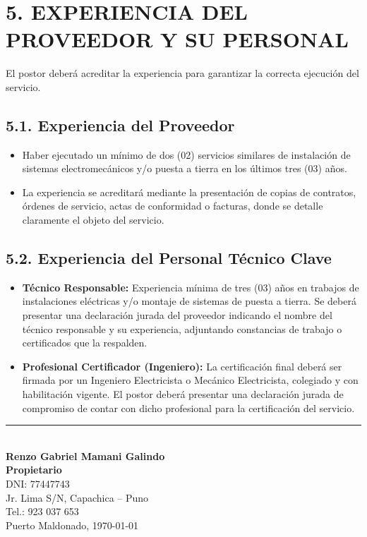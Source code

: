 \documentclass[12pt,a4paper]{article}
\begin{document}
\section*{5. EXPERIENCIA DEL PROVEEDOR Y SU PERSONAL}

El postor deberá acreditar la experiencia para garantizar la correcta ejecución del servicio.

\subsection*{5.1. Experiencia del Proveedor}

\begin{itemize}
  \item Haber ejecutado un mínimo de dos (02) servicios similares de instalación de sistemas electromecánicos y/o puesta a tierra en los últimos tres (03) años.
  \item La experiencia se acreditará mediante la presentación de copias de contratos, órdenes de servicio, actas de conformidad o facturas, donde se detalle claramente el objeto del servicio.
\end{itemize}

\subsection*{5.2. Experiencia del Personal Técnico Clave}

\begin{itemize}
  \item \textbf{Técnico Responsable:} Experiencia mínima de tres (03) años en trabajos de instalaciones eléctricas y/o montaje de sistemas de puesta a tierra. Se deberá presentar una declaración jurada del proveedor indicando el nombre del técnico responsable y su experiencia, adjuntando constancias de trabajo o certificados que la respalden.
  \item \textbf{Profesional Certificador (Ingeniero):} La certificación final deberá ser firmada por un Ingeniero Electricista o Mecánico Electricista, colegiado y con habilitación vigente. El postor deberá presentar una declaración jurada de compromiso de contar con dicho profesional para la certificación del servicio.
\end{itemize}

\vspace{1cm}

\begin{center}
\rule{8cm}{0.4pt} \\
{\large\textbf{Renzo Gabriel Mamani Galindo}} \\
\textbf{Propietario} \\
DNI: 77447743 \\
Jr. Lima S/N, Capachica -- Puno \\
Tel.: 923 037 653 \\
\medskip
Puerto Maldonado, \today
\end{center}
\end{document}
